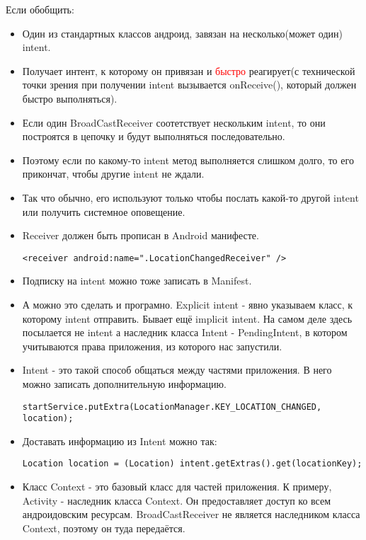 \documentclass[12 pt]{article}
\begin{document}
    Если обобщить:
    \begin{itemize}
        \item Один из стандартных классов андроид, завязан на несколько(может один) intent. 
	    \item Получает интент, к которому он привязан и \textcolor{red}{быстро} реагирует(с технической точки зрения при получении intent вызывается onReceive(), который должен быстро выполняться).
		\item Если один BroadCastReceiver соотетствует нескольким intent, то они построятся в цепочку и будут выполняться последовательно.
		\item Поэтому если по какому-то intent метод выполняется слишком долго, то его прикончат, чтобы другие intent не ждали.
		\item Так что обычно, его используют только чтобы послать какой-то другой intent или получить системное оповещение.
 		\item Receiver должен быть прописан в Android манифесте.
        \begin{lstlisting}
<receiver android:name=".LocationChangedReceiver" />
        \end{lstlisting}		    
 	    \item Подписку на intent можно тоже записать в Manifest.
        \item А можно это сделать и програмно. Explicit intent - явно указываем класс, к которому intent отправить. Бывает ещё implicit intent. На самом деле здесь посылается не intent а наследник класса Intent - PendingIntent, в котором учитываются права приложения, из которого нас запустили. 
        \item Intent - это такой способ общаться между частями приложения. В него можно записать дополнительную информацию.
        \begin{lstlisting}
startService.putExtra(LocationManager.KEY_LOCATION_CHANGED, location);
        \end{lstlisting}        
        \item Доставать информацию из Intent можно так:
        \begin{lstlisting}
Location location = (Location) intent.getExtras().get(locationKey);
        \end{lstlisting}
        \item Класс Context - это базовый класс для частей приложения. К примеру, Activity - наследник класса Context. Он предоставляет доступ ко всем андроидовским ресурсам. BroadCastReceiver не является наследником класса Context, поэтому он туда передаётся.
    \end{itemize}
\end{document}
